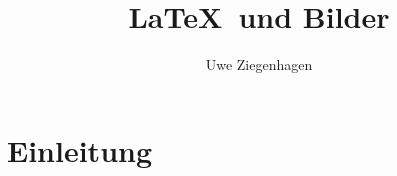 \documentclass[12pt,parskip=half]{scrartcl}
\author{Uwe Ziegenhagen}
\title{\LaTeX\ und Bilder}
\begin{document}
\maketitle

\section{Einleitung}

\blindtext[2]


\blindtext[2]
\end{document}
